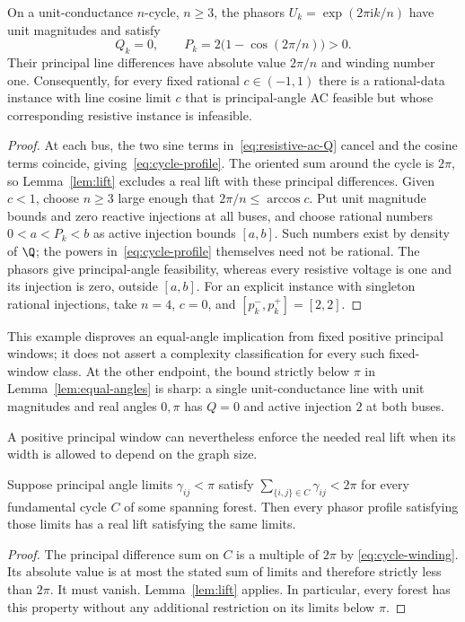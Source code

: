 \begin{proposition}
\label{prop:winding-counterexample}
On a unit-conductance $n$-cycle, $n\ge3$, the phasors
$U_k=\exp(2\pi\mathrm{i}k/n)$ have unit magnitudes and satisfy
\begin{equation}
 Q_k=0,\qquad P_k=2\bigl(1-\cos(2\pi/n)\bigr)>0.
 \label{eq:cycle-profile}
\end{equation}
Their principal line differences have absolute value $2\pi/n$ and winding
number one. Consequently, for every fixed rational $c\in(-1,1)$ there is a
rational-data instance with line cosine limit $c$ that is principal-angle
AC feasible but whose corresponding resistive instance is infeasible.
\end{proposition}
\begin{proof}
At each bus, the two sine terms in~\eqref{eq:resistive-ac-Q} cancel and the
cosine terms coincide, giving~\eqref{eq:cycle-profile}. The oriented sum
around the cycle is $2\pi$, so Lemma~\ref{lem:lift} excludes a real lift
with these principal differences. Given $c<1$, choose $n\ge3$ large enough
that $2\pi/n\le\arccos c$. Put unit magnitude bounds and zero reactive
injections at all buses, and choose rational numbers $0<a<P_k<b$ as active
injection bounds $[a,b]$. Such numbers exist by density of $\Q$; the powers
in~\eqref{eq:cycle-profile} themselves need not be rational. The phasors
give principal-angle feasibility, whereas every resistive voltage is one
and its injection is zero, outside $[a,b]$.
For an explicit instance with singleton rational injections, take $n=4$,
$c=0$, and $[p_k^-,p_k^+]=[2,2]$.
\end{proof}

This example disproves an equal-angle implication from fixed positive
principal windows; it does not assert a complexity classification for every
such fixed-window class. At the other endpoint, the bound strictly below
$\pi$ in Lemma~\ref{lem:equal-angles} is sharp: a single unit-conductance
line with unit magnitudes and real angles $0,\pi$ has $Q=0$ and active
injection $2$ at both buses.

A positive principal window can nevertheless enforce the needed real lift
when its width is allowed to depend on the graph size.

\begin{lemma}
\label{lem:small-cycle-budget}
Suppose principal angle limits $\gamma_{ij}<\pi$ satisfy
$\sum_{\{i,j\}\in C}\gamma_{ij}<2\pi$ for every fundamental cycle $C$
of some spanning forest. Then every phasor profile satisfying those limits
has a real lift satisfying the same limits.
\end{lemma}
\begin{proof}
The principal difference sum on $C$ is a multiple of $2\pi$ by
\eqref{eq:cycle-winding}. Its absolute value is at most the stated sum of
limits and therefore strictly less than $2\pi$. It must vanish.
Lemma~\ref{lem:lift} applies. In particular, every forest has this property
without any additional restriction on its limits below $\pi$.
\end{proof}

